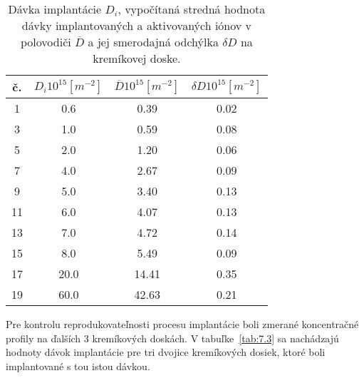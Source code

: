 \begin{table}[h!]\centering
  \begin{minipage}[c]{\myfiguresize}
    \begin{center}
      \begin{tabular}{c c c c}
        \hline
        č. & ${D_{i}}{10}^{15}[m^{-2}]$ & $\overline{D}{10}^{15}[m^{-2}]$ & $\delta{D}{10}^{15}[m^{-2}]$\\
        \hline
         1 &  0.6 &  0.39 &  0.02\\
         3 &  1.0 &  0.59 &  0.08\\
         5 &  2.0 &  1.20 &  0.06\\
         7 &  4.0 &  2.67 &  0.09\\
         9 &  5.0 &  3.40 &  0.13\\
        11 &  6.0 &  4.07 &  0.13\\
        13 &  7.0 &  4.72 &  0.14\\
        15 &  8.0 &  5.49 &  0.09\\
        17 & 20.0 & 14.41 &  0.35\\
        19 & 60.0 & 42.63 &  0.21\\
        \hline
      \end{tabular}
    \end{center}
    \caption[Dávky implantácie $D_{i}$]{Dávka implantácie $D_{i}$,
      vypočítaná stredná hodnota dávky implantovaných a aktivovaných
      iónov v polovodiči $\overline D$ a jej smerodajná odchýlka
      $\delta D$ na kremíkovej doske.}\label{tab:7.2}
  \end{minipage}
\end{table}

Pre kontrolu reprodukovateľnosti procesu implantácie boli zmerané
koncentračné profily na ďalších 3 kremíkových doskách.  V
tabuľke~\ref{tab:7.3} sa nachádzajú hodnoty dávok implantácie pre tri
dvojice kremíkových dosiek, ktoré boli implantované s tou istou
dávkou.

